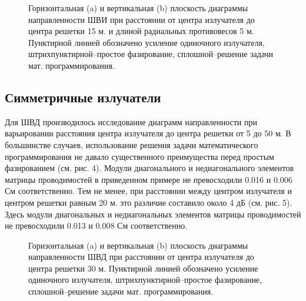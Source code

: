 \begin{figure}
\begin{minipage}[h]{0.49\linewidth}
\end{minipage}
\hfill
\begin{minipage}[h]{0.49\linewidth}
\end{minipage}
\caption{Горизонтальная (a) и вертикальная (b) плоскость диаграммы направленности ШВИ при расстоянии от центра излучателя до центра решетки 15 м. и длиной радиальных противовесов 5 м. Пунктирной линией обозначено усиление одиночного излучателя, штрихпунктирной--простое фазирование, сплошной--решение задачи мат. программирования.}
\label{ris:bve_mut}
\end{figure}

\subsection{Симметричные излучатели}
Для ШВД производилось исследование диаграмм направленности при варьировании расстояния центра излучателя до центра решетки от 5 до 50 м. В большинстве случаев, использование решения задачи математического программирования не давало существенного преимущества перед простым фазированием (см. рис. 4). Модули диагонального и недиагонального элементов матрицы проводимостей в приведенном примере не превосходили 0.016 и 0.006 См соответственно.   Тем не менее, при расстоянии между центром излучателя и центром решетки равным 20 м. это различие составило около 4 дБ (см. рис. 5). Здесь модули диагональных и недиагональных элементов матрицы проводимостей не превосходили 0.013 и 0.008 См соответственно.

\begin{figure}
\begin{minipage}[h]{0.49\linewidth}
\end{minipage}
\hfill
\begin{minipage}[h]{0.49\linewidth}
\end{minipage}
\caption{Горизонтальная (a) и вертикальная (b) плоскость диаграммы направленности ШВД при расстоянии от центра излучателя до центра решетки 30 м. Пунктирной линией обозначено усиление одиночного излучателя, штрихпунктирной--простое фазирование, сплошной--решение задачи мат. программирования.}
\label{ris:bve_mut}
\end{figure}

